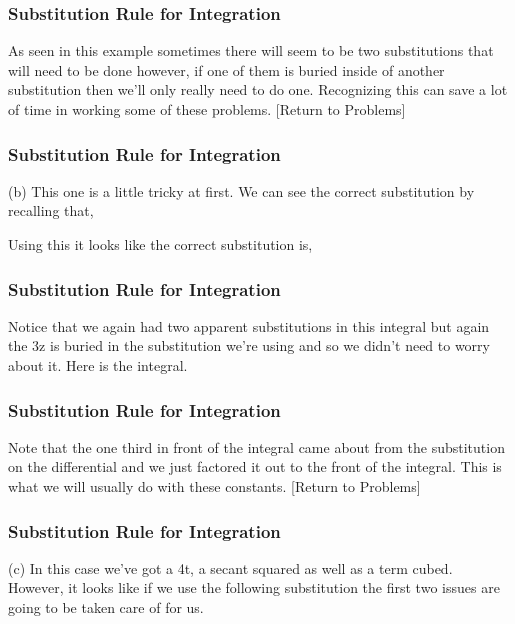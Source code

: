 \documentclass{beamer}
\begin{document}
 \begin{frame}
 	\frametitle{Substitution Rule for Integration}
 	\large
As seen in this example sometimes there will seem to be two substitutions that will need to be done however, if one of them is buried inside of another substitution then we’ll only really need to do one.  Recognizing this can save a lot of time in working some of these problems.
[Return to Problems]
\end{frame}
\begin{frame}
	\frametitle{Substitution Rule for Integration}
	\large
(b) 
This one is a little tricky at first.  We can see the correct substitution by recalling that,
                                                      
 
Using this it looks like the correct substitution is,
                
\end{frame}
\begin{frame}
	\frametitle{Substitution Rule for Integration}
	\large 
Notice that we again had two apparent substitutions in this integral but again the 3z is buried in the substitution we’re using and so we didn’t need to worry about it.
Here is the integral.
                                         
\end{frame}
\begin{frame}
	\frametitle{Substitution Rule for Integration}
	\large 
Note that the one third in front of the integral came about from the substitution on the differential and we just factored it out to the front of the integral.  This is what we will usually do with these constants.
[Return to Problems]
 
\end{frame}
\begin{frame}
	\frametitle{Substitution Rule for Integration}
	\large
(c) 
In this case we’ve got a 4t, a secant squared as well as a term cubed.  However, it looks like if we use the following substitution the first two issues are going to be taken care of for us.
                
\end{frame}
\end{document}
